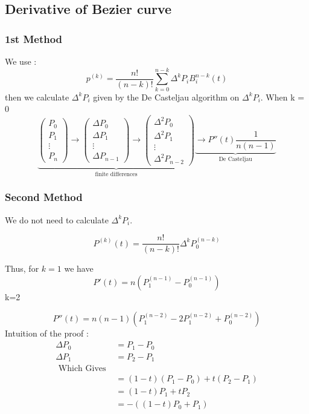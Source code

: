 \subsection{Derivative of Bezier curve}
\label{subsec:Derivative of Bezier curve}
\subsubsection{1st Method}
We use : 
\[
    p^{(k)} = \frac{ n!  }{ \left( n-k\right) ! } \sum_{k=0}^{n-k} \Delta^k P_i B _{ i }^{
    n-k} (t) 
\]
then we calculate $ \Delta ^k P_i  $ given by the De Casteljau algorithm on $ \Delta^kP_i
$.
When k = 0 
\[
\underbrace{
\begin{pmatrix*}
    P_0  \\
    P_1 \\
    \vdots \\
    P_n 
\end{pmatrix*}
\to  
\begin{pmatrix*}
    \Delta P_0  \\
    \Delta P_1 \\
    \vdots \\
    \Delta P_{n-1}  
\end{pmatrix*}
\to 
\begin{pmatrix*}
    \Delta^2 P_0  \\
    \Delta^2 P_1 \\
    \vdots \\ 
    \Delta^2 P_{n-2}  
\end{pmatrix*}}_{ \text{finite differences}} 
\underbrace{
\to 
P''(t) \frac{ 1 }{ n\left( n-1\right)  } }_{\text{De Casteljau}}
\]

\subsubsection{Second Method}
We do not need to calculate $ \Delta^k P_i  $. 
\begin{prop}[]
   \[
       P^{(k)} (t) = \frac{ n!  }{ \left( n-k\right) ! } \Delta ^k P _{ 0 }^{ \left( n-k\right)  } 
   \] 
    \label{def:}
\end{prop}

Thus, for $ k = 1 $ we have 
\[
    P'(t) = n\left( P _{ 1 }^{ (n-1)  } - P _{ 0 }^{ (n-1) } \right) 
\]
k=2 

\[
    P''(t) = n(n-1)\left( P _{ 1 }^{ (n-2)  } -2P _{ 1 }^{ (n-2) } +  P _{ 0 }^{ (n-2) } \right) 
\]
Intuition of the proof : 
\begin{align*}
    \Delta P_0  &= P_1 - P_0  \\
    \Delta P_1  &= P_2 - P_1  \\
    \text{ Which Gives }& \\
     &= \left( 1-t\right) \left( P_1 - P_0 \right) + t\left( P_2 - P_1 \right)  \\ 
      &= \left( 1-t\right) P_1 + tP_2  \\ 
       &= - \left( \left( 1-t\right) P_0 + P_1\right)  \\ 
\end{align*}


